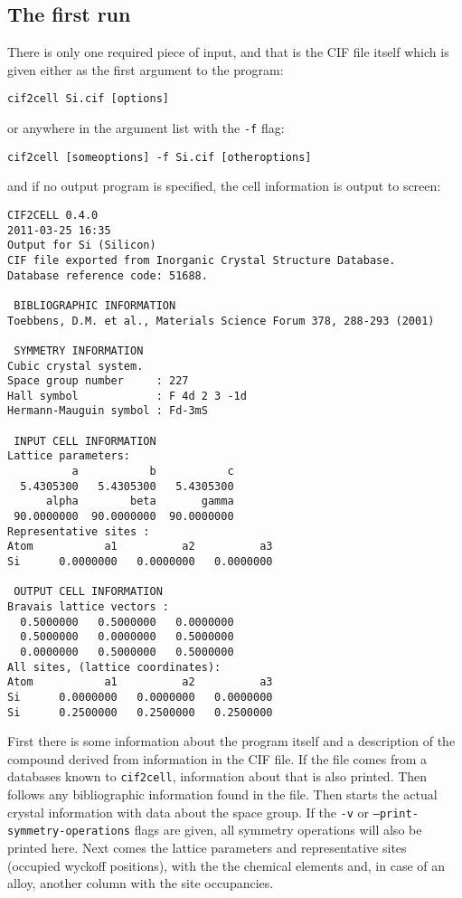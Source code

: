 \documentclass[11pt]{article}
\newcommand{\ciftocell}{\texttt{cif2cell}}
\begin{document}
\subsection{The first run}
There is only one required piece of input, and that is the CIF file itself which is given either as the first argument to the program:
\begin{verbatim}
cif2cell Si.cif [options]
\end{verbatim}
or anywhere in the argument list with the \texttt{-f} flag:
\begin{verbatim}
cif2cell [someoptions] -f Si.cif [otheroptions]
\end{verbatim}
and if no output program is specified, the cell information is output to screen:

\begin{verbatim}
CIF2CELL 0.4.0
2011-03-25 16:35
Output for Si (Silicon)
CIF file exported from Inorganic Crystal Structure Database.
Database reference code: 51688.

 BIBLIOGRAPHIC INFORMATION
Toebbens, D.M. et al., Materials Science Forum 378, 288-293 (2001) 

 SYMMETRY INFORMATION
Cubic crystal system.
Space group number     : 227
Hall symbol            : F 4d 2 3 -1d
Hermann-Mauguin symbol : Fd-3mS

 INPUT CELL INFORMATION
Lattice parameters:
          a           b           c 
  5.4305300   5.4305300   5.4305300 
      alpha        beta       gamma 
 90.0000000  90.0000000  90.0000000 
Representative sites :
Atom           a1          a2          a3 
Si      0.0000000   0.0000000   0.0000000

 OUTPUT CELL INFORMATION
Bravais lattice vectors :
  0.5000000   0.5000000   0.0000000 
  0.5000000   0.0000000   0.5000000 
  0.0000000   0.5000000   0.5000000 
All sites, (lattice coordinates):
Atom           a1          a2          a3 
Si      0.0000000   0.0000000   0.0000000
Si      0.2500000   0.2500000   0.2500000
\end{verbatim}

\newpage
First there is some information about the program itself and a description of the compound derived from information in the CIF file. If the file comes from a databases known to \ciftocell, information about that is also printed. Then follows any bibliographic information found in the file. Then starts the actual crystal information with data about the space group. If the \texttt{-v} or \texttt{--print-symmetry-operations} flags are given, all symmetry operations will also be printed here. Next comes the lattice parameters and representative sites (occupied wyckoff positions), with the the chemical elements and, in case of an alloy, another column with the site occupancies.
\end{document}
